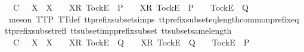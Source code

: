 \begin{isabellebody}
\ {\isachardoublequoteopen}{\isasymrho}{\isacharprime}\ {\isasymsubseteq}\isactrlsub C\ {\isasymrho}{\isacharprime}{\isacharprime}\ {\isasymLongrightarrow}\ X\ {\isasymsubseteq}\ X{\isacharprime}\ {\isasymLongrightarrow}\ {\isasymrho}{\isacharprime}{\isacharprime}\ {\isacharat}\ {\isacharbrackleft}{\isacharbrackleft}X{\isacharprime}{\isacharbrackright}\isactrlsub R{\isacharcomma}\ {\isacharbrackleft}Tock{\isacharbrackright}\isactrlsub E{\isacharbrackright}\ {\isasymin}\ P\ {\isasymLongrightarrow}\ {\isasymrho}{\isacharprime}\ {\isacharat}\ {\isacharbrackleft}{\isacharbrackleft}X{\isacharbrackright}\isactrlsub R{\isacharcomma}\ {\isacharbrackleft}Tock{\isacharbrackright}\isactrlsub E{\isacharbrackright}\ {\isasymnotin}\ P\ {\isasymLongrightarrow}\ {\isasymrho}{\isacharprime}\ {\isacharat}\ {\isacharbrackleft}{\isacharbrackleft}Tock{\isacharbrackright}\isactrlsub E{\isacharbrackright}\ {\isasymin}\ Q{\isachardoublequoteclose}\isanewline
\ \ \ \ \ \ \isamarkupfalse%
\ {\isacharparenleft}meson\ TT{}{\isacharunderscore}P\ TT{}{\isacharunderscore}def\ tt{\isacharunderscore}prefix{\isacharunderscore}subset{\isachardot}simps{\isacharparenleft}{}{\isacharparenright}\ tt{\isacharunderscore}prefix{\isacharunderscore}subset{\isacharunderscore}eq{\isacharunderscore}length{\isacharunderscore}common{\isacharunderscore}prefix{\isacharunderscore}eq\ tt{\isacharunderscore}prefix{\isacharunderscore}subset{\isacharunderscore}refl\ tt{\isacharunderscore}subset{\isacharunderscore}imp{\isacharunderscore}prefix{\isacharunderscore}subset\ tt{\isacharunderscore}subset{\isacharunderscore}same{\isacharunderscore}length{\isacharparenright}\isanewline
\ \ \isamarkupfalse%
\isanewline
\ \ \ \ \isamarkupfalse%
\ {\isachardoublequoteopen}{\isasymrho}{\isacharprime}\ {\isasymsubseteq}\isactrlsub C\ {\isasymrho}{\isacharprime}{\isacharprime}\ {\isasymLongrightarrow}\ X\ {\isasymsubseteq}\ X{\isacharprime}\ {\isasymLongrightarrow}\ {\isasymrho}{\isacharprime}{\isacharprime}\ {\isacharat}\ {\isacharbrackleft}{\isacharbrackleft}X{\isacharprime}{\isacharbrackright}\isactrlsub R{\isacharcomma}\ {\isacharbrackleft}Tock{\isacharbrackright}\isactrlsub E{\isacharbrackright}\ {\isasymin}\ Q\ {\isasymLongrightarrow}\ {\isasymrho}{\isacharprime}\ {\isacharat}\ {\isacharbrackleft}{\isacharbrackleft}X{\isacharbrackright}\isactrlsub R{\isacharcomma}\ {\isacharbrackleft}Tock{\isacharbrackright}\isactrlsub E{\isacharbrackright}\ {\isasymnotin}\ Q\ {\isasymLongrightarrow}\ {\isasymrho}{\isacharprime}\ {\isacharat}\ {\isacharbrackleft}{\isacharbrackleft}Tock{\isacharbrackright}\isactrlsub E{\isacharbrackright}\ {\isasymin}\ P{\isachardoublequoteclose}\isanewline

\end{isabellebody}
